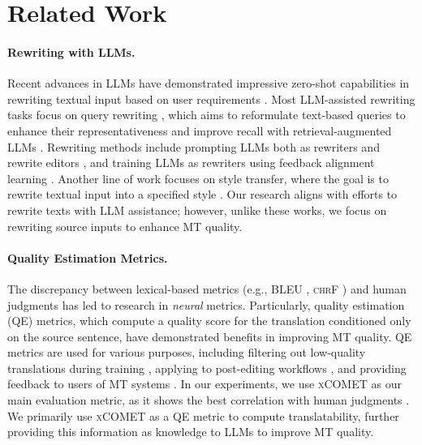 \section{Related Work}

\paragraph{Rewriting with LLMs.} 
Recent advances in LLMs have demonstrated impressive zero-shot capabilities in rewriting textual input based on user requirements \citep{shu2023rewritelm}. Most LLM-assisted rewriting tasks focus on query rewriting \citep{efthimiadis1996query}, which aims to reformulate text-based queries to enhance their representativeness and improve recall with retrieval-augmented LLMs \citep{mao-etal-2023-search, Zhu_2024}. Rewriting methods include prompting LLMs both as rewriters and rewrite editors \citep{ye-etal-2023-enhancing, kunilovskaya-etal-2024-mitigating}, and training LLMs as rewriters using feedback alignment learning \citep{ma-etal-2023-query, mao2024rafe}. Another line of work focuses on style transfer, where the goal is to rewrite textual input into a specified style \citep{wordcraft, hallinan2023steer}. Our research aligns with efforts to rewrite texts with LLM assistance; however, unlike these works, we focus on rewriting source inputs to enhance MT quality.

\paragraph{Quality Estimation Metrics.}
The discrepancy between lexical-based metrics (e.g., \textsc{BLEU} \citep{papineni-etal-2002-bleu}, \textsc{chrF} \citep{popovic-2015-chrf}) and human judgments \citep{ma-etal-2019-results} has led to research in \textit{neural} metrics. Particularly, quality estimation (QE) metrics, which compute a quality score for the translation conditioned only on the source sentence, have demonstrated benefits in improving MT quality. QE metrics are used for various purposes, including filtering out low-quality translations during training \citep{tomani2024qualityaware}, applying to post-editing workflows \citep{bechara2021role}, and providing feedback to users of MT systems \citep{mehandru2023physician}. In our experiments, we use \textsc{xCOMET} as our main evaluation metric, as it shows the best correlation with human judgments \citep{agrawal2024automatic}. We primarily use \textsc{xCOMET} as a QE metric to compute translatability, further providing this information as knowledge to LLMs to improve MT quality.

